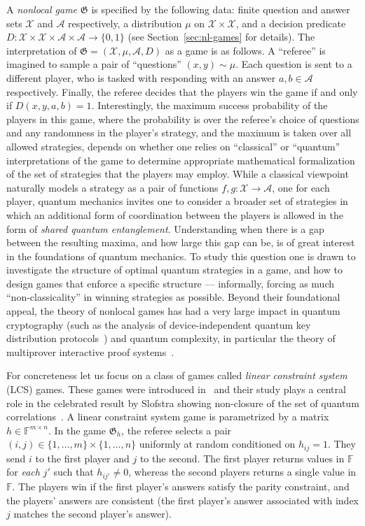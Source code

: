 \documentclass[11pt]{article}
\theoremstyle{definition}
\newcommand{\F}{\ensuremath{\mathbb{F}}}
\newcommand{\mA}{\ensuremath{\mathcal{A}}}
\newcommand{\mX}{\ensuremath{\mathcal{X}}}
\newcommand{\game}{\mathfrak{G}}
\begin{document}
 A \emph{nonlocal game} $\game$ is specified by the following data: finite question and answer sets $\mX$ and $\mA$ respectively, a distribution $\mu$ on $\mX\times \mX$, and a decision predicate $D:\mX\times \mX\times \mA\times \mA\to \{0,1\}$ (see Section~\ref{sec:nl-games} for details). The interpretation of $\game=(\mX,\mu,\mA,D)$ as a game is as follows. A ``referee'' is imagined to sample a pair of ``questions'' $(x,y)\sim \mu$. Each question is sent to a different player, who is tasked with responding with an answer $a,b\in \mA$ respectively. Finally, the referee decides that the players win the game if and only if $D(x,y,a,b)=1$. Interestingly, the maximum success probability of the players in this game, where the probability is over the referee's choice of questions and any randomness in the player's strategy, and the maximum is taken over all allowed strategies, depends on whether one relies on ``classical'' or ``quantum'' interpretations of the game to determine appropriate mathematical formalization of the set of strategies that the players may employ. While a classical viewpoint naturally models a strategy as a pair of functions $f,g:\mX\to\mA$, one for each player, quantum mechanics invites one to consider a broader set of strategies in which an additional form of coordination between the players is allowed in the form of \emph{shared quantum entanglement}. Understanding when there is a gap between the resulting maxima, and how large this gap can be, is of great interest in the foundations of quantum mechanics. To study this question one is drawn to investigate the structure of optimal quantum strategies in a game, and how to design games that enforce a specific structure --- informally, forcing as much ``non-classicality'' in winning strategies as possible. Beyond their foundational appeal, the theory of nonlocal games has had a very large impact in quantum cryptography (such as the analysis of device-independent quantum key distribution protocols~\cite{vazirani2019fully,arnon2019simple}) and quantum complexity, in particular the theory of multiprover interactive proof systems~\cite{cleve2004consequences}.

For concreteness let us focus on a class of games called \emph{linear constraint system} (LCS) games. These games were introduced in~\cite{cleve2014characterization} and their study plays a central role in the celebrated result by Slofstra showing non-closure of the set of quantum correlations~\cite{slofstra2019set}. A linear constraint system game is parametrized by a matrix $h\in \F^{m\times n}$. In the game $\game_h$, the referee selects a pair $(i,j)\in \{1,\ldots,m\}\times\{1,\ldots,n\}$ uniformly at random conditioned on $h_{ij}=1$. They send $i$ to the first player and $j$ to the second. The first player returns values in $\F$ for \emph{each} $j'$ such that $h_{ij'}\neq 0$, whereas the second players returns a single value in $\F$. The players win if the first player's answers satisfy the parity constraint, and the players' answers are consistent (the first player's answer associated with index $j$ matches the second player's answer). 
\end{document}
